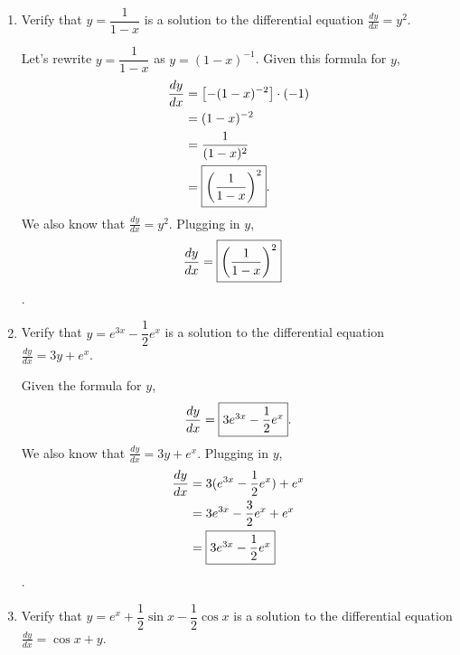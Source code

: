 \documentclass{article}
\begin{document}
\begin{enumerate}
\begin{enumerate}
      \begin{solution}
          Given the formula for $y$, 
          \begin{align*}
              \frac{dy}{dx}&=\fbox{$-2e^{-x}+1$}.
          \end{align*}
          We also know that $\frac{dy}{dx}=x-y$. Plugging in $y$, 
          \begin{align*}
            \frac{dy}{dx}&=x-(2e^{-x}+x-1)\\&=x-2e^{-x}-x+1\\&=\fbox{$-2e^{-x}+1$}
          \end{align*}.
      \end{solution}
      \pspace{\vfill}
      \item Verify that $y=\dfrac{1}{1-x}$ is a solution to the differential equation $\frac{dy}{dx}=y^2$. 
      
      \begin{solution}
          Let's rewrite $y=\dfrac{1}{1-x}$ as $y=(1-x)^{-1}$.
          Given this formula for $y$, 
          \begin{align*}
              \frac{dy}{dx}&=\left[-(1-x)^{-2}\right]\cdot(-1)\\&=(1-x)^{-2}\\&=\dfrac{1}{(1-x)^2}\\&=\fbox{$\left(\dfrac{1}{1-x}\right)^2$}.
          \end{align*}
          We also know that $\frac{dy}{dx}=y^2$. Plugging in $y$, 
          \begin{align*}
            \frac{dy}{dx}&=\fbox{$\left(\dfrac{1}{1-x}\right)^2$}
          \end{align*}.
      \end{solution}
      \pspace{\vfill}
      \item Verify that $y=e^{3x}-\dfrac{1}{2}e^x$ is a solution to the differential equation $\frac{dy}{dx}=3y+e^x$.

      \begin{solution}
      Given the formula for $y$,
      \begin{align*}
              \frac{dy}{dx}=\fbox{$3e^{3x}-\dfrac{1}{2}e^x$}.
          \end{align*}
          We also know that $\frac{dy}{dx}=3y+e^x$. Plugging in $y$, 
          \begin{align*}
            \frac{dy}{dx}&=3(e^{3x}-\dfrac{1}{2}e^x)+e^x \\ &= 3e^{3x}-\dfrac{3}{2}e^x+e^x\\&=\fbox{$3e^{3x}-\dfrac{1}{2}e^x$}
          \end{align*}.
      \end{solution}
      \pspace{\vfill}
      \item Verify that $y=e^x+\dfrac{1}{2}\sin x-\dfrac{1}{2}\cos x$ is a solution to the differential equation $\frac{dy}{dx}=\cos x + y$. 
      

\end{enumerate}
\end{enumerate}
\end{document}
